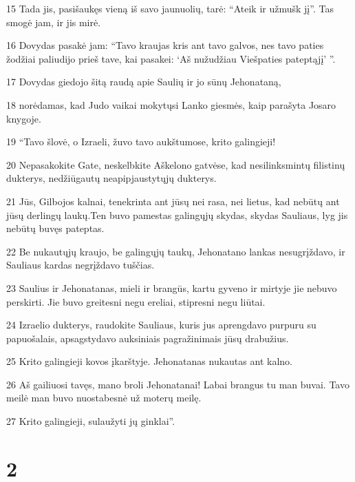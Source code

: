 \par 15 Tada jis, pasišaukęs vieną iš savo jaunuolių, tarė: “Ateik ir užmušk jį”. Tas smogė jam, ir jis mirė. 
\par 16 Dovydas pasakė jam: “Tavo kraujas kris ant tavo galvos, nes tavo paties žodžiai paliudijo prieš tave, kai pasakei: ‘Aš nužudžiau Viešpaties pateptąjį’ ”. 
\par 17 Dovydas giedojo šitą raudą apie Saulių ir jo sūnų Jehonataną, 
\par 18 norėdamas, kad Judo vaikai mokytųsi Lanko giesmės, kaip parašyta Josaro knygoje. 
\par 19 “Tavo šlovė, o Izraeli, žuvo tavo aukštumose, krito galingieji! 
\par 20 Nepasakokite Gate, neskelbkite Aškelono gatvėse, kad nesilinksmintų filistinų dukterys, nedžiūgautų neapipjaustytųjų dukterys. 
\par 21 Jūs, Gilbojos kalnai, tenekrinta ant jūsų nei rasa, nei lietus, kad nebūtų ant jūsų derlingų laukų.Ten buvo pamestas galingųjų skydas, skydas Sauliaus, lyg jis nebūtų buvęs pateptas. 
\par 22 Be nukautųjų kraujo, be galingųjų taukų, Jehonatano lankas nesugrįždavo, ir Sauliaus kardas negrįždavo tuščias. 
\par 23 Saulius ir Jehonatanas, mieli ir brangūs, kartu gyveno ir mirtyje jie nebuvo perskirti. Jie buvo greitesni negu ereliai, stipresni negu liūtai. 
\par 24 Izraelio dukterys, raudokite Sauliaus, kuris jus aprengdavo purpuru su papuošalais, apsagstydavo auksiniais pagražinimais jūsų drabužius. 
\par 25 Krito galingieji kovos įkarštyje. Jehonatanas nukautas ant kalno. 
\par 26 Aš gailiuosi tavęs, mano broli Jehonatanai! Labai brangus tu man buvai. Tavo meilė man buvo nuostabesnė už moterų meilę. 
\par 27 Krito galingieji, sulaužyti jų ginklai”.


\chapter{2}


